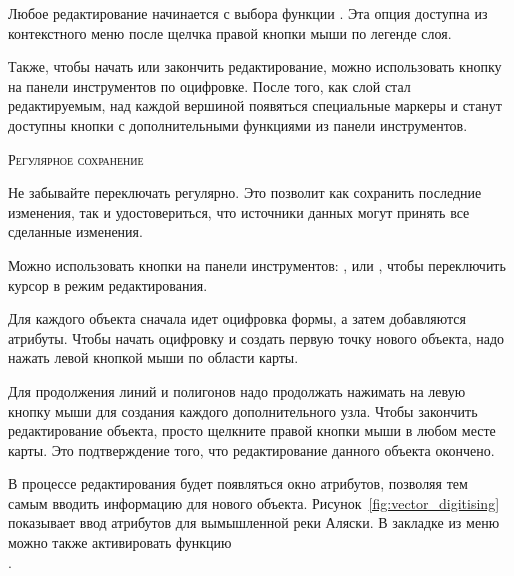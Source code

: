 Любое редактирование начинается с выбора функции
.
Эта опция доступна из контекстного меню после щелчка правой кнопки мыши
по легенде слоя.

Также, чтобы начать или закончить редактирование, можно использовать
кнопку 
 на панели инструментов
по оцифровке. После того, как слой стал редактируемым,
над каждой вершиной появяться специальные маркеры и станут доступны кнопки
с дополнительными функциями из панели инструментов.

\begin{Совет}\caption{\textsc{Регулярное сохранение}}
Не забывайте переключать 
регулярно. Это позволит как сохранить последние изменения, так и удостовериться,
что источники данных могут принять все сделанные изменения.
\end{Совет}


Можно использовать кнопки на панели инструментов:
,
 или
, чтобы переключить \qg
курсор в режим редактирования.

Для каждого объекта сначала идет оцифровка формы, а затем добавляются атрибуты.
Чтобы начать оцифровку и создать первую точку нового объекта, надо нажать
левой кнопкой мыши по области карты.

Для продолжения линий и полигонов надо продолжать нажимать на левую кнопку
мыши для создания каждого дополнительного узла. Чтобы закончить
редактирование объекта, просто щелкните правой кнопки мыши в любом
месте карты. Это подтверждение того, что редактирование данного объекта
окончено.

В процессе редактирования будет появляться окно атрибутов, позволяя тем
самым вводить информацию для нового объекта.
Рисунок~\ref{fig:vector_digitising} показывает ввод атрибутов для вымышленной реки
Аляски. В закладке  из меню  \arrow
{} можно также активировать функцию \\
.

